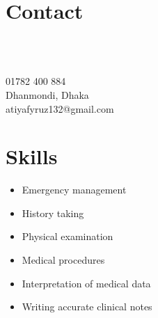 \documentclass[a4paper,12pt]{article}
\begin{document}
\begin{minipage}[t][20cm]{0.3\textwidth}
\raggedright
\section*{Contact}
    \begin{minipage}[t]{0.1\textwidth}
        \faPhone\\
        \faMapMarker\\
        \faEnvelopeO
    \end{minipage}
    \begin{minipage}[t]{0.7\textwidth}
        01782 400 884\\
        Dhanmondi, Dhaka\\
        atiyafyruz132@gmail.com
    \end{minipage}
\section*{Skills}
\begin{itemize}[left=0em, itemsep=0pt, parsep=0pt]
    \item Emergency management
    \item History taking
    \item Physical examination
    \item Medical procedures
    \item Interpretation of medical data
    \item Writing accurate clinical notes
\end{itemize}

\end{minipage}
\hspace{0.5cm}\vrule\hspace{0.5cm}
\end{document}
